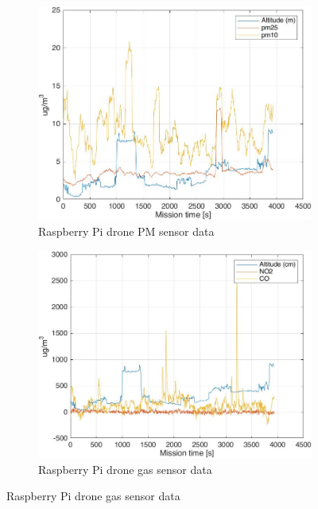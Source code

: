 \begin{figure}
    \centering
    \begin{subfigure}[b]{0.45\textwidth}
        \centering
        \includegraphics[width=\textwidth]{images/flight-data/raspberry/pms_R.jpg}
        \caption{Raspberry Pi drone PM sensor data}
        \label{fig:pms_R}
    \end{subfigure}
    \hfill
    \begin{subfigure}[b]{0.45\textwidth}
        \centering
        \includegraphics[width=\textwidth]{images/flight-data/raspberry/ariasensors_R.jpg}
        \caption{Raspberry Pi drone gas sensor data}
        \label{fig:ariasensors_R}
    \end{subfigure}


\end{figure}
